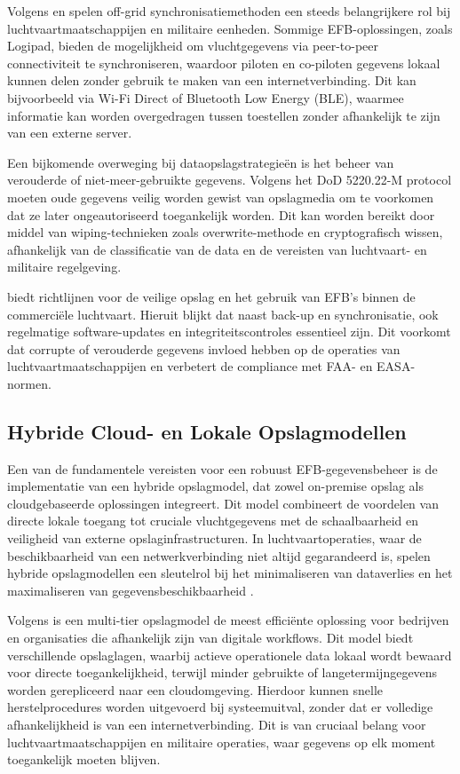 Volgens \textcite{ForeFlightEFB} en \textcite{LogipadEFB} spelen off-grid synchronisatiemethoden een steeds belangrijkere rol bij luchtvaartmaatschappijen en militaire eenheden. Sommige EFB-oplossingen, zoals Logipad, bieden de mogelijkheid om vluchtgegevens via peer-to-peer connectiviteit te synchroniseren, waardoor piloten en co-piloten gegevens lokaal kunnen delen zonder gebruik te maken van een internetverbinding. Dit kan bijvoorbeeld via Wi-Fi Direct of Bluetooth Low Energy (BLE), waarmee informatie kan worden overgedragen tussen toestellen zonder afhankelijk te zijn van een externe server.

Een bijkomende overweging bij dataopslagstrategieën is het beheer van verouderde of niet-meer-gebruikte gegevens. Volgens het DoD 5220.22-M protocol \autocite{DoD5220} moeten oude gegevens veilig worden gewist van opslagmedia om te voorkomen dat ze later ongeautoriseerd toegankelijk worden. Dit kan worden bereikt door middel van wiping-technieken zoals overwrite-methode en cryptografisch wissen, afhankelijk van de classificatie van de data en de vereisten van luchtvaart- en militaire regelgeving.

\textcite{FAA_AC91-78A} biedt richtlijnen voor de veilige opslag en het gebruik van EFB’s binnen de commerciële luchtvaart. Hieruit blijkt dat naast back-up en synchronisatie, ook regelmatige software-updates en integriteitscontroles essentieel zijn. Dit voorkomt dat corrupte of verouderde gegevens invloed hebben op de operaties van luchtvaartmaatschappijen en verbetert de compliance met FAA- en EASA-normen.

        
\subsection{Hybride Cloud- en Lokale Opslagmodellen}

Een van de fundamentele vereisten voor een robuust EFB-gegevensbeheer is de implementatie van een hybride opslagmodel, dat zowel on-premise opslag als cloudgebaseerde oplossingen integreert. Dit model combineert de voordelen van directe lokale toegang tot cruciale vluchtgegevens met de schaalbaarheid en veiligheid van externe opslaginfrastructuren. In luchtvaartoperaties, waar de beschikbaarheid van een netwerkverbinding niet altijd gegarandeerd is, spelen hybride opslagmodellen een sleutelrol bij het minimaliseren van dataverlies en het maximaliseren van gegevensbeschikbaarheid \autocite{AWSBackup}.

Volgens \textcite{MicrosoftBackup} is een multi-tier opslagmodel de meest efficiënte oplossing voor bedrijven en organisaties die afhankelijk zijn van digitale workflows. Dit model biedt verschillende opslaglagen, waarbij actieve operationele data lokaal wordt bewaard voor directe toegankelijkheid, terwijl minder gebruikte of langetermijngegevens worden gerepliceerd naar een cloudomgeving. Hierdoor kunnen snelle herstelprocedures worden uitgevoerd bij systeemuitval, zonder dat er volledige afhankelijkheid is van een internetverbinding. Dit is van cruciaal belang voor luchtvaartmaatschappijen en militaire operaties, waar gegevens op elk moment toegankelijk moeten blijven.

